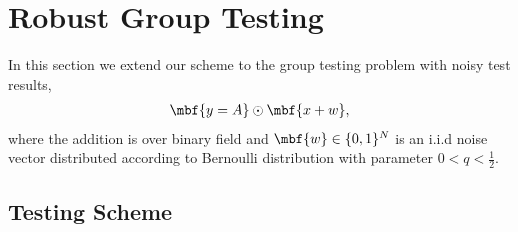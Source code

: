 \documentclass[conference,twocolumn]{IEEEtran}
\begin{document}
{\section{Robust Group Testing}
\label{Sec:NoisyGroupTesting}
In this section we extend our scheme to the group testing problem with noisy test results,
\begin{align*}
\mbf{y=A}\odot \mbf{x+w},
\end{align*}
where the addition is over binary field and $\mbf{w}\in\{0,1\}^N$ is an i.i.d noise vector distributed according to Bernoulli distribution with parameter $0<q<\frac{1}{2}$.

\subsection*{Testing Scheme}

}
\end{document}
